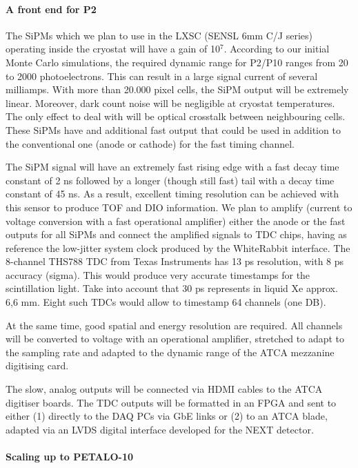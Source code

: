 \paragraph{A front end for P2}
%
The SiPMs which we plan to use in the LXSC (SENSL 6mm C/J series)
operating inside the cryostat will have a gain of 10$^7$. According to our initial Monte Carlo simulations, the required dynamic range for P2/P10 ranges from 20 to 2000 photoelectrons.  This can result in a large signal current of several milliamps. With more than 20.000  pixel cells, the SiPM output will be extremely linear. Moreover, dark count noise will be negligible at cryostat temperatures. The only effect to deal with will be optical crosstalk between neighbouring cells. These SiPMs have and additional fast output that could be used in addition to the conventional one (anode or cathode) for the fast timing channel.

The SiPM signal will have an extremely fast rising edge with a fast decay time constant of 2 ns followed by a longer (though still fast) tail with a decay time constant of 45 ns. As a result, excellent timing resolution can be achieved with this sensor to produce TOF and DIO information. We plan to amplify (current to voltage conversion with a fast operational amplifier) either the anode or the fast outputs for all SiPMs and connect the amplified signals to TDC chips, having as reference the low-jitter system clock produced by the WhiteRabbit interface. The 8-channel THS788 TDC from Texas Instruments has 13 ps resolution, with 8 ps accuracy (sigma). This would produce very accurate timestamps for the scintillation light. Take into account that 30 ps represents in liquid Xe  approx. 6,6 mm. Eight such TDCs would allow to timestamp 64 channels (one DB).

At the same time, good spatial and energy resolution are required. All channels will be converted to voltage with an operational amplifier, stretched to adapt to the sampling rate and adapted to the dynamic range of the ATCA mezzanine digitising card.

The slow, analog outputs will be connected via HDMI cables to the ATCA digitiser boards. The TDC outputs will be formatted in an FPGA and sent to either (1) directly to the DAQ PCs via GbE links or (2) to an ATCA blade, adapted via an LVDS digital interface developed for the NEXT detector.
%
\paragraph{Scaling up to PETALO-10}

